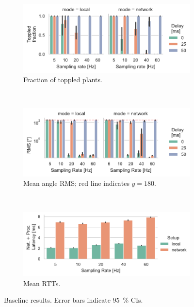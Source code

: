 \begin{figure}[t]
    \centering
    \begin{subfigure}[t]{.7\textwidth}
        \centering
        \includegraphics[width=\textwidth]{publications/2022CLEAVE/plots/fixed_single_loop_toppled}
        \caption{Fraction of toppled plants.}\label{paper:olguinmunoz2022cleave:fig:single:topple}
    \end{subfigure}\\
    \begin{subfigure}[t]{.7\textwidth}
        \centering
        \includegraphics[width=\textwidth]{publications/2022CLEAVE/plots/fixed_single_loop_rms}
        \caption{Mean angle \gls{RMS}; red line indicates \( y = 180 \).}\label{paper:olguinmunoz2022cleave:fig:single:rms}
    \end{subfigure}\\
    \begin{subfigure}[t]{.7\textwidth}
        \centering
        \includegraphics[width=\textwidth]{publications/2022CLEAVE/plots/fixed_single_loop_rtts}
        \caption{
            Mean \glspl{RTT}.
        }\label{fig:single:rtt}
    \end{subfigure}%
    \caption[caption]{
        Baseline results.
        Error bars indicate \SI{95}{\percent} \glspl{CI}.
        }%
    \label{paper:olguinmunoz2022cleave:fig:single}
\end{figure}

